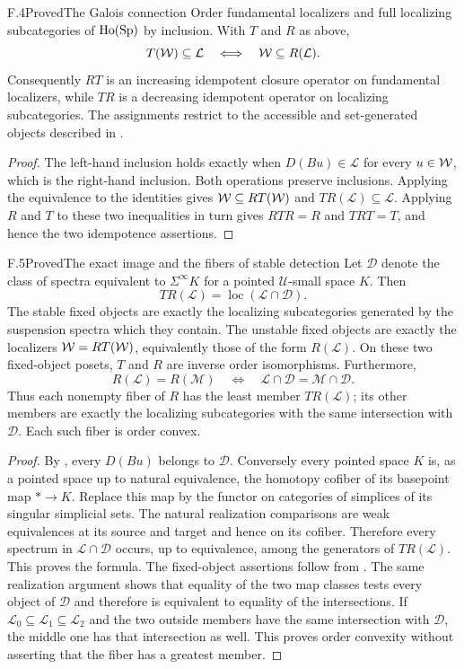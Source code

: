 \begin{claim}{F.4}{Proved}{The Galois connection}
Order fundamental localizers and full localizing subcategories of
$\operatorname{Ho}(\mathrm{Sp})$ by inclusion. With $T$ and $R$ as above,
\[
 T(\mathcal{W})\subseteq\mathcal L
   \quad\Longleftrightarrow\quad
 \mathcal{W}\subseteq R(\mathcal L).
\]
Consequently $RT$ is an increasing idempotent closure operator on
fundamental localizers, while $TR$ is a decreasing idempotent operator on
localizing subcategories. The assignments restrict to the accessible and
set-generated objects described in .
\end{claim}
\begin{proof}
The left-hand inclusion holds exactly when $D(Bu)\in\mathcal L$ for every
$u\in\mathcal{W}$, which is the right-hand inclusion. Both operations preserve
inclusions. Applying the equivalence to the identities gives
$\mathcal{W}\subseteq RT(\mathcal{W})$ and $TR(\mathcal L)\subseteq\mathcal L$.
Applying $R$ and $T$ to these two inequalities in turn gives
$RTR=R$ and $TRT=T$, and hence the two idempotence assertions.
\end{proof}

\begin{claim}{F.5}{Proved}{The exact image and the fibers of stable detection}
Let $\mathscr D$ denote the class of spectra equivalent to
$\Sigma^\infty K$ for a pointed $\mathcal U$-small space $K$.
Then
\[
 TR(\mathcal L)=\operatorname{loc}(\mathcal L\cap\mathscr D).
\]
The stable fixed objects are exactly the localizing subcategories generated
by the suspension spectra which they contain. The unstable fixed objects
are exactly the localizers $\mathcal{W}=RT(\mathcal{W})$, equivalently those of the form
$R(\mathcal L)$. On these two fixed-object posets, $T$ and $R$ are inverse
order isomorphisms. Furthermore,
\[
 R(\mathcal L)=R(\mathcal M)
 \quad\Longleftrightarrow\quad
 \mathcal L\cap\mathscr D=\mathcal M\cap\mathscr D.
\]
Thus each nonempty fiber of $R$ has the least member $TR(\mathcal L)$;
its other members are exactly the localizing subcategories with the same
intersection with $\mathscr D$. Each such fiber is order convex.
\end{claim}
\begin{proof}
By , every $D(Bu)$ belongs to $\mathscr D$. Conversely every
pointed space $K$ is, as a pointed space up to natural equivalence, the
homotopy cofiber of its basepoint map $*\to K$. Replace this map by the
functor on categories of simplices of its singular simplicial sets. The
natural realization comparisons are weak equivalences at its source and
target and hence on its cofiber. Therefore every spectrum in
$\mathcal L\cap\mathscr D$ occurs, up to equivalence, among the generators
of $TR(\mathcal L)$. This proves the formula. The fixed-object assertions
follow from . The same realization argument shows that
equality of the two map classes tests every object of $\mathscr D$ and
therefore is equivalent to equality of the intersections. If
$\mathcal L_0\subseteq\mathcal L_1\subseteq\mathcal L_2$ and the two
outside members have the same intersection with $\mathscr D$, the middle
one has that intersection as well. This proves order convexity without
asserting that the fiber has a greatest member.
\end{proof}

